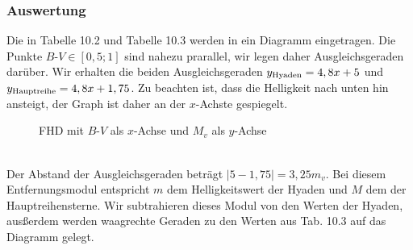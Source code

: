 \documentclass[12pt]{article}
\begin{document}
\subsubsection*{Auswertung}
Die in Tabelle 10.2 und Tabelle 10.3 werden in ein Diagramm eingetragen. Die Punkte $B$-$V \in [0,5;1]$ sind nahezu prarallel, wir legen daher Ausgleichsgeraden darüber. Wir erhalten die beiden Ausgleichsgeraden $y_{\textnormal{Hyaden}} = 4,8x + 5$ und $y_{\textnormal{Hauptreihe}} = 4,8 x + 1,75$. Zu beachten ist, dass die Helligkeit nach unten hin ansteigt, der Graph ist daher an der $x$-Achste gespiegelt.
\begin{figure}[h!]
    \centering
{}
\caption{FHD mit $B$-$V$ als $x$-Achse und $M_v$ als $y$-Achse}
\end{figure}\\
Der Abstand der Ausgleichsgeraden beträgt $|5-1,75|= 3,25 m_v$. Bei diesem Entfernungsmodul entspricht $m$ dem Helligkeitswert der Hyaden und $M$ dem der Hauptreihensterne. Wir subtrahieren dieses Modul von den Werten der Hyaden, ausßerdem werden waagrechte Geraden zu den Werten aus Tab. 10.3 auf das Diagramm gelegt.
\newpage\noindent
\end{document}
